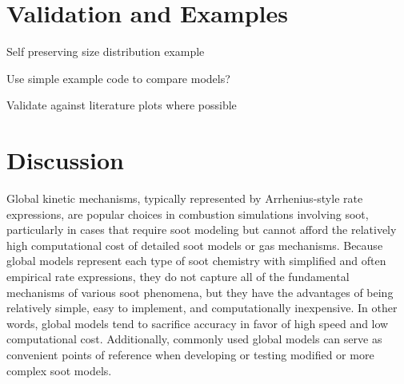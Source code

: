 \documentclass[preprint,letterpaper]{elsarticle}
\begin{document}

\section{Validation and Examples}
\label{s:examples}

Self preserving size distribution example

Use simple example code to compare models?

Validate against literature plots where possible



\section{Discussion}
\label{s:discussion}

%
%
%
%
%
Global kinetic mechanisms, typically represented by Arrhenius-style rate expressions, are popular choices in combustion simulations involving soot, particularly in cases that require soot modeling but cannot afford the relatively high computational cost of detailed soot models or gas mechanisms. Because global models represent each type of soot chemistry with simplified and often empirical rate expressions, they do not capture all of the fundamental mechanisms of various soot phenomena, but they have the advantages of being relatively simple, easy to implement, and computationally inexpensive. In other words, global models tend to sacrifice accuracy in favor of high speed and low computational cost. Additionally, commonly used global models can serve as convenient points of reference when developing or testing modified or more complex soot models.
\end{document}
